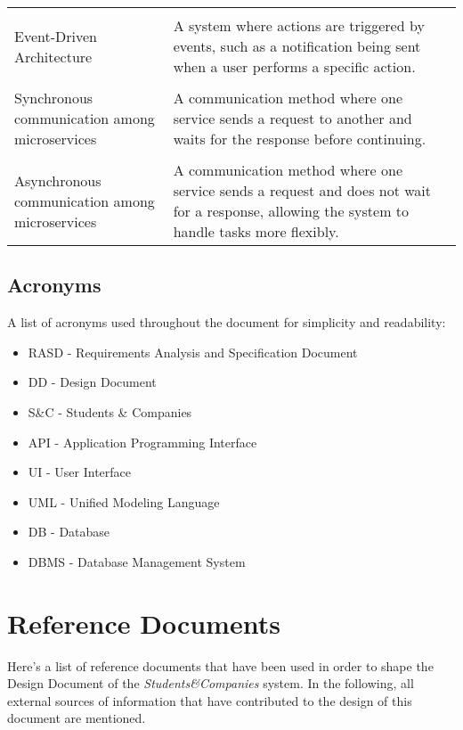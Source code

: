 \begin{longtable}{p{}p{}}
    \vspace{0.5em}\\
    Event-Driven Architecture & A system where actions are triggered by events, such as a notification being sent when
    a user performs a specific action. \\
    
    \vspace{0.5em}\\
    Synchronous communication among microservices & A communication method where one service sends a request to another
    and waits for the response before continuing. \\
    
    \vspace{0.5em}\\
    Asynchronous communication among microservices & A communication method where one service sends a request and does
    not wait for a response, allowing the system to handle tasks more flexibly. \\
    
\end{longtable}

\subsection{Acronyms}

A list of acronyms used throughout the document for simplicity and readability:
\\
\begin{itemize}
    \item {RASD} - Requirements Analysis and Specification Document
    \item {DD} - Design Document
    \item {S\&C} - Students \& Companies
    \item {API} - Application Programming Interface
    \item {UI} - User Interface
    \item {UML} - Unified Modeling Language
    \item {DB} - Database
    \item {DBMS} - Database Management System
\end{itemize}

\newpage
\section{Reference Documents} 

Here’s a list of reference documents that have been used in order to shape the Design Document of the \textit{Students\&Companies} system. In the following, all external sources of information that have contributed to the design of this document are mentioned.

